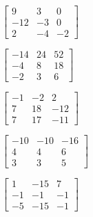 \begin{exercise}
\begin{parts}
\item \(\begin{bmatrix} 9 & 3 & 0
\\-12 & -3 & 0
\\2 & -4 & -2 \end{bmatrix}\)

\item \(\begin{bmatrix} -14 & 24 & 52
\\-4 & 8 & 18
\\-2 & 3 & 6 \end{bmatrix}\)

\item \(\begin{bmatrix} -1 & -2 & 2
\\7 & 18 & -12
\\7 & 17 & -11 \end{bmatrix}\)

\item \(\begin{bmatrix} -10 & -10 & -16
\\4 & 4 & 6
\\3 & 3 & 5 \end{bmatrix}\)

\item \(\begin{bmatrix} 1 & -15 & 7
\\-1 & -1 & -1
\\-5 & -15 & -1 \end{bmatrix}\)

\end{parts}
\end{exercise}






